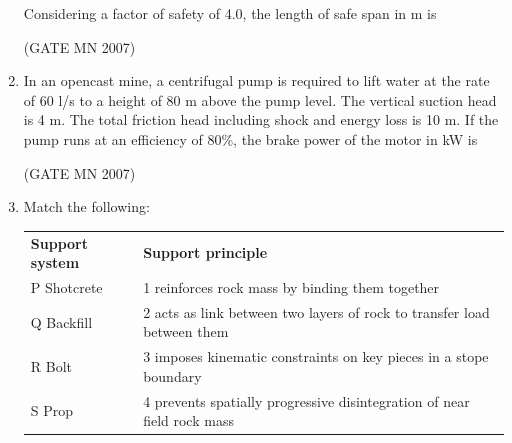 \documentclass[journal]{IEEEtran}
\begin{document}
\begin{enumerate}
Considering a factor of safety of 4.0, the length of safe span in m is
\begin{enumerate}
\end{enumerate}

\hfill (GATE MN 2007)

\item In an opencast mine, a centrifugal pump is required to lift water at the rate of 60 l/s to a height of 80 m above the pump level. The vertical suction head is 4 m. The total friction head including shock and energy loss is 10 m. If the pump runs at an efficiency of 80\%, the brake power of the motor in kW is
\begin{enumerate}
\end{enumerate}

\hfill (GATE MN 2007)


\item Match the following:

\begin{tabular}{p{5cm} p{5cm}}
\textbf{Support system} & \textbf{Support principle} \\
P \quad Shotcrete & 1 \quad reinforces rock mass by binding them together \\
Q \quad Backfill & 2 \quad acts as link between two layers of rock to transfer load between them \\
R \quad Bolt & 3 \quad imposes kinematic constraints on key pieces in a stope boundary \\
S \quad Prop & 4 \quad prevents spatially progressive disintegration of near field rock mass \\
\end{tabular}

\begin{enumerate}
\end{enumerate}


\end{enumerate}
\end{document}
